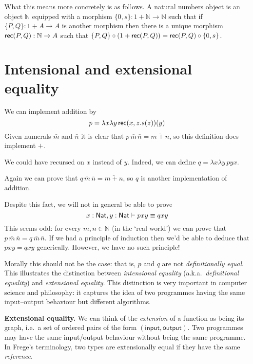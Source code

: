 \documentclass[12pt]{article}
\begin{document}
What this means more concretely is as follows. A natural numbers object is an object $\mathbb{N}$ equipped with a morphism $\{0,s\} : 1 + \mathbb{N} \to \mathbb{N}$ such that if $\{P,Q\} : 1 + A \to A$ is another morphism then there is a unique morphism $\mathsf{rec}(P,Q) : \mathbb{N} \to A$ such that $\{P,Q\} \circ (1 + \mathsf{rec}(P,Q)) = \mathsf{rec}(P,Q) \circ \{ 0,s \}$.

\section{Intensional and extensional equality}

We can implement addition by
\begin{equation*}
p = \lambda x \lambda y\, \mathsf{rec}(x, z.s(z))(y)
\end{equation*}
Given numerals $\bar m$ and $\bar n$ it is clear that $p\, \bar m\, \bar n = \overline{m+n}$, so this definition does implement $+$.

We could have recursed on $x$ instead of $y$. Indeed, we can define $q = \lambda x \lambda y\, pyx$.

Again we can prove that $q\, \bar m\, \bar n = \overline{m+n}$, so $q$ is another implementation of addition.

Despite this fact, we will not in general be able to prove
\begin{equation*}
x : \mathsf{Nat}, y : \mathsf{Nat} \vdash pxy \equiv qxy
\end{equation*}
This seems odd: for every $m, n \in \mathbb{N}$ (in the `real world') we can prove that $p\, \bar m\, \bar n = q\, \bar m\, \bar n$. If we had a principle of induction then we'd be able to deduce that $pxy=qxy$ generically. However, we have no such principle!

Morally this should not be the case: that is, $p$ and $q$ are not \emph{definitionally equal}. This illustrates the distinction between \emph{intensional equality} (a.k.a.\ \emph{definitional equality}) and \emph{extensional equality}. This distinction is very important in computer science and philosophy: it captures the idea of two programmes having the same input--output behaviour but different algorithms.

\textbf{Extensional equality.} We can think of the \emph{extension} of a function as being its graph, i.e.\ a set of ordered pairs of the form $(\mathsf{input},\mathsf{output})$. Two programmes may have the same input/output behaviour without being the same programme. In Frege's terminology, two types are extensionally equal if they have the same \emph{reference}.
\end{document}
